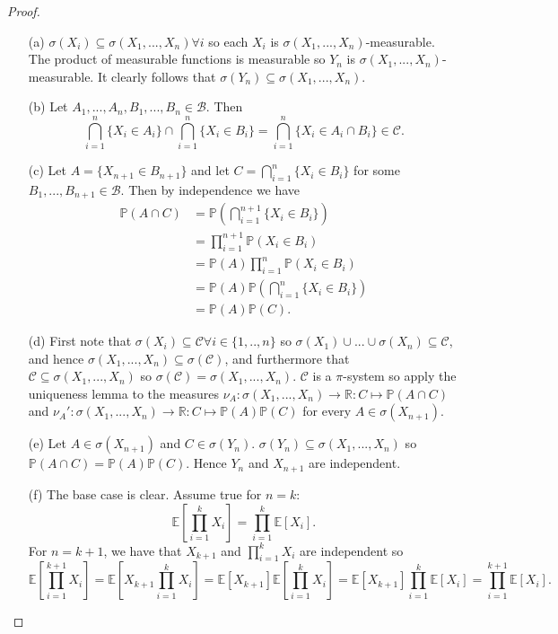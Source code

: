 \documentclass{article}
\begin{document}
\begin{proof}
\begin{enumerate}
    \item[(a)] $\sigma(X_i)\subseteq\sigma(X_1,...,X_n)\forall i$ so each $X_i$ is $\sigma(X_1,...,X_n)$-measurable. The product of measurable functions is measurable so $Y_n$ is $\sigma(X_1,...,X_n)$-measurable. It clearly follows that $\sigma(Y_n)\subseteq\sigma(X_1,...,X_n)$.
    \item[(b)] Let $A_1,...,A_n,B_1,...,B_n\in\mathcal{B}$. Then\[\bigcap_{i=1}^n\{X_i\in A_i\}\cap\bigcap_{i=1}^n\{X_i\in B_i\}=\bigcap_{i=1}^n\{X_i\in A_i\cap B_i\}\in\mathcal{C}.\]
    \item[(c)] Let $A=\{X_{n+1}\in B_{n+1}\}$ and let $C=\bigcap_{i=1}^n\{X_i\in B_i\}$ for some $B_1,...,B_{n+1}\in\mathcal{B}$. Then by independence we have \begin{align*}\mathbb{P}(A\cap C)&=\mathbb{P}(\bigcap_{i=1}^{n+1}\{X_i\in B_i\})\\&=\prod_{i=1}^{n+1}\mathbb{P}(X_i\in B_i)\\&=\mathbb{P}(A)\prod_{i=1}^n\mathbb{P}(X_i\in B_i)\\&=\mathbb{P}(A)\mathbb{P}(\bigcap_{i=1}^n\{X_i\in B_i\})\\&=\mathbb{P}(A)\mathbb{P}(C).\end{align*}
    \item[(d)] First note that $\sigma(X_i)\subseteq\mathcal{C}\forall i\in\{1,..,n\}$ so $\sigma(X_1)\cup...\cup\sigma(X_n)\subseteq\mathcal{C}$, and hence $\sigma(X_1,...,X_n)\subseteq\sigma(\mathcal{C})$, and furthermore that $\mathcal{C}\subseteq\sigma(X_1,...,X_n)$ so $\sigma(\mathcal{C})=\sigma(X_1,...,X_n)$. $\mathcal{C}$ is a $\pi$-system so apply the uniqueness lemma to the measures $\nu_A:\sigma(X_1,...,X_n)\to\mathbb{R}:C\mapsto\mathbb{P}(A\cap C)$ and $\nu_A':\sigma(X_1,...,X_n)\to\mathbb{R}:C\mapsto\mathbb{P}(A)\mathbb{P}(C)$ for every $A\in\sigma(X_{n+1})$.
    \item[(e)] Let $A\in\sigma(X_{n+1})$ and $C\in\sigma(Y_n)$. $\sigma(Y_n)\subseteq\sigma(X_1,...,X_n)$ so $\mathbb{P}(A\cap C)=\mathbb{P}(A)\mathbb{P}(C)$. Hence $Y_n$ and $X_{n+1}$ are independent.
    \item[(f)] The base case is clear. Assume true for $n=k$:\[\mathbb{E}\left[\prod_{i=1}^k X_i\right]=\prod_{i=1}^k\mathbb{E}[X_i].\] For $n=k+1$, we have that $X_{k+1}$ and $\prod_{i=1}^k X_i$ are independent so\[\mathbb{E}\left[\prod_{i=1}^{k+1}X_i\right]=\mathbb{E}\left[X_{k+1}\prod_{i=1}^kX_i\right]=\mathbb{E}[X_{k+1}]\mathbb{E}\left[\prod_{i=1}^kX_i\right]=\mathbb{E}[X_{k+1}]\prod_{i=1}^k\mathbb{E}[X_i]=\prod_{i=1}^{k+1}\mathbb{E}[X_i].\]
\end{enumerate}
\end{proof}
\end{document}
